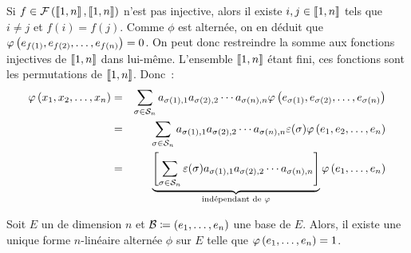 \documentclass{magnolia}
\begin{document}
\begin{preuve}
       Si $f\in\mathcal{F}\left(\left\llbracket 1,n\right\rrbracket,\left\llbracket 1,n\right\rrbracket\right)$ n'est pas injective, alors il
  existe $i,j\in\left\llbracket 1,n\right\rrbracket$ tels que $i\neq j$ et $f(i)=f(j)$. Comme $\phi$
  est alternée, on en déduit que $\varphi\left(e_{f\left(1\right)},e_{f\left(2\right)},\ldots,e_{f(n)}\right)=0$.
  On peut donc restreindre la somme aux fonctions injectives de $\left\llbracket 1,n\right\rrbracket$
  dans lui-même. L'ensemble $\left\llbracket 1,n\right\rrbracket$ étant fini, ces fonctions sont les
  permutations de $\left\llbracket 1,n\right\rrbracket$. Donc~:
  \begin{eqnarray*}
  \phi\p{x_1,x_2,\ldots,x_n}
  &=& \sum_{\sigma\in\gsym{n}}
       a_{\sigma\p{1},1} a_{\sigma\p{2},2} \cdots a_{\sigma(n),n}
       \phi\p{e_{\sigma\p{1}},e_{\sigma\p{2}},\ldots,e_{\sigma(n)}}\\
  &=& \sum_{\sigma\in\gsym{n}}
       a_{\sigma\p{1},1} a_{\sigma\p{2},2} \cdots a_{\sigma(n),n} \signat{\sigma} 
       \phi\p{e_1,e_2,\ldots,e_n}\\
       &=& \underbrace{\cro{\sum_{\sigma\in\gsym{n}} \signat{\sigma}
  a_{\sigma\p{1},1}a_{\sigma\p{2},2}\cdots a_{\sigma(n),n}}}_{\text{indépendant de } \phi}
  \phi\p{e_1,\ldots,e_n}
  \end{eqnarray*}


\end{preuve}

\begin{theoreme}
Soit $E$ un \Kev de dimension $n$ et $\mathcal{B}\coloneqq\left(e_1,\ldots,e_n\right)$ une base de
$E$. Alors, il existe une unique forme $n$-linéaire alternée $\phi$ sur $E$ telle
que $\varphi\left(e_1,\ldots,e_n\right)=1$.
\end{theoreme}
\end{document}

